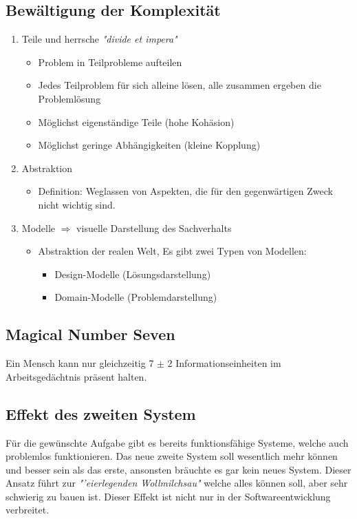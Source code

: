 \subsection{Bewältigung der Komplexität}	
		\begin{enumerate}
			\item Teile und herrsche \textit{"divide et impera"}
					\begin{itemize}
						\item Problem in Teilprobleme aufteilen
						\item Jedes Teilproblem für sich alleine lösen, alle zusammen ergeben die Problemlösung
						\item Möglichst eigenständige Teile (hohe Kohäsion)
						\item Möglichst geringe Abhängigkeiten (kleine Kopplung)
					\end{itemize}
			\item Abstraktion
					\begin{itemize}
						\item Definition: Weglassen von Aspekten, die für den gegenwärtigen Zweck nicht wichtig sind.
					\end{itemize}
			\item Modelle \newline
			$\Rightarrow$ visuelle Darstellung des Sachverhalts 
					\begin{itemize}
						\item Abstraktion der realen Welt, Es gibt zwei Typen von Modellen:
                        \begin{itemize}
                        \item Design-Modelle (Lösungsdarstellung)
                        \item Domain-Modelle (Problemdarstellung)
                        \end{itemize}
					\end{itemize}
		\end{enumerate}
\subsection{Magical Number Seven}
Ein Mensch kann nur gleichzeitig 7 $\pm$ 2 Informationseinheiten im Arbeitsgedächtnis präsent halten.
\subsection{Effekt des zweiten System}
Für die gewünschte Aufgabe gibt es bereits funktionsfähige Systeme, welche auch problemlos funktionieren. Das neue zweite System soll wesentlich mehr können und besser sein als das erste, ansonsten bräuchte es gar kein neues System. Dieser Ansatz führt zur \textit{"'eierlegenden Wollmilchsau"} welche alles können soll, aber sehr schwierig zu bauen ist. Dieser Effekt ist nicht nur in der Softwareentwicklung verbreitet. 
\clearpage
